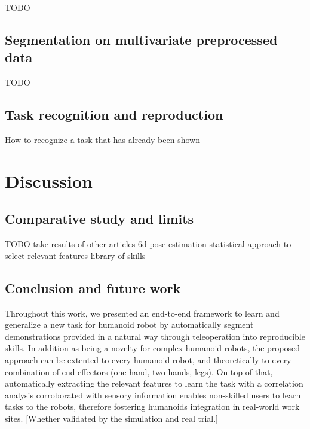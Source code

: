 \documentclass[conference]{IEEEtran}
\begin{document}
TODO

\subsection{Segmentation on multivariate preprocessed data}

TODO 

\subsection{Task recognition and reproduction}

How to recognize a task that has already been shown

\section{Discussion}\label{discussion}

\subsection{Comparative study and limits}

TODO take results of other articles
6d pose estimation
statistical approach to select relevant features
library of skills

\subsection{Conclusion and future work}

Throughout this work, we presented an end-to-end framework to learn and generalize a new task for humanoid robot by automatically segment demonstrations provided in a natural way through teleoperation into reproducible skills. In addition as being a novelty for complex humanoid robots, the proposed approach can be extented to every humanoid robot, and theoretically to every combination of end-effectors (one hand, two hands, legs). On top of that, automatically extracting the relevant features to learn the task with a correlation analysis corroborated with sensory information enables non-skilled users to learn tasks to the robots, therefore fostering humanoids integration in real-world work sites. [Whether validated by the simulation and real trial.] \newline
\end{document}
